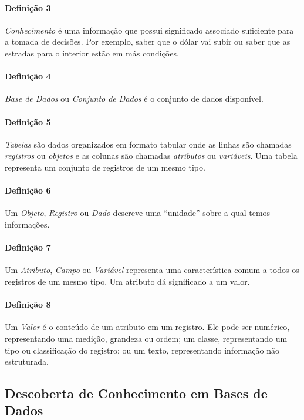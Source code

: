 \documentclass[12pt,a4paper]{article}
\begin{document}
\paragraph{Definição 3}
\textit{Conhecimento} é uma informação que possui significado associado suficiente para a tomada de decisões. Por exemplo, saber que o dólar vai subir ou saber que as estradas para o interior estão em más condições.

\paragraph{Definição 4}
\textit{Base de Dados} ou \textit{Conjunto de Dados} é o conjunto de dados disponível.

\paragraph{Definição 5}
\textit{Tabelas} são dados organizados em formato tabular onde as linhas são chamadas \textit{registros} ou \textit{objetos} e as colunas são chamadas \textit{atributos} ou \textit{variáveis}. Uma tabela representa um conjunto de registros de um mesmo tipo.

\paragraph{Definição 6}
Um \textit{Objeto}, \textit{Registro} ou \textit{Dado} descreve uma \enquote{unidade} sobre a qual temos informações.

\paragraph{Definição 7}
Um \textit{Atributo}, \textit{Campo} ou \textit{Variável} representa uma característica comum a todos os registros de um mesmo tipo. Um atributo dá significado a um valor.

\paragraph{Definição 8}
Um \textit{Valor} é o conteúdo de um atributo em um registro. Ele pode ser numérico, representando uma medição, grandeza ou ordem; um classe, representando um tipo ou classificação do registro; ou um texto, representando informação não estruturada.

\subsection{Descoberta de Conhecimento em Bases de Dados}
\end{document}

